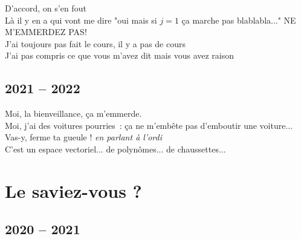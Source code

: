 \documentclass[french, a4paper, openany]{book}
\begin{document}
	\noindent \og D'accord, on s'en fout \fg \\
	\og Là il y en a qui vont me dire "oui mais si $j = 1$ ça marche pas blablabla..." NE M'EMMERDEZ PAS! \fg \\
	\og J'ai toujours pas fait le cours, il y a pas de cours \fg \\
	\og J'ai pas compris ce que vous m'avez dit mais vous avez raison \fg \\

\section{2021 -- 2022}

	\noindent \og Moi, la bienveillance, ça m'emmerde. \fg \\
	\og Moi, j'ai des voitures pourries~: ça ne m'embête pas d'emboutir une voiture... \fg \\
	\og Vas-y, ferme ta gueule ! \fg \emph{en parlant à l'ordi} \\
	\og C'est un espace vectoriel... de polynômes... de chaussettes... \fg \\

\chapter{Le saviez-vous ?}

\section{2020 -- 2021}
\end{document}
